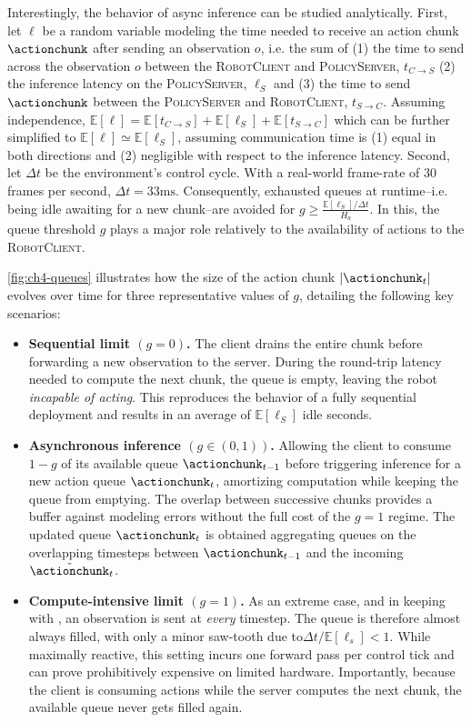 Interestingly, the behavior of async inference can be studied analytically. First, let \( \ell \) be a random variable modeling the time needed to receive an action chunk \( \actionchunk \) after sending an observation \( o \), i.e. the sum of (1) the time to send across the observation \( o \) between the \textsc{RobotClient} and \textsc{PolicyServer}, \( t_{C \to S}\) (2) the inference latency on the \textsc{PolicyServer}, \( \ell_S \) and (3) the time to send \( \actionchunk \) between the \textsc{PolicyServer} and \textsc{RobotClient}, \( t_{S \to C} \). Assuming independence, \( \mathbb E [\ell] = \mathbb E[t_{C \to S}] + \mathbb E[\ell_S] + \mathbb E[t_{S \to C}] \) which can be further simplified to \( \mathbb E[\ell] \simeq \mathbb E[\ell_S]  \), assuming communication time is (1) equal in both directions and (2) negligible with respect to the inference latency. Second, let \(\Delta t\) be the environment’s control cycle. With a real-world frame-rate of 30 frames per second, \(\Delta t=33\text{ms}\). Consequently, exhausted queues at runtime--i.e. being idle awaiting for a new chunk--are avoided for \( g \geq \frac{\mathbb E[\ell_S] / \Delta t}{H_a} \). In this, the queue threshold \( g \) plays a major role relatively to the availability of actions to the \textsc{RobotClient}.

\ref{fig:ch4-queues} illustrates how the size of the action chunk \(\lvert \actionchunk_t \rvert\) evolves over time for three representative values of \(g\), detailing the following key scenarios:
\begin{itemize}
    \item \textbf{Sequential limit \((g=0)\).} The client drains the entire chunk before forwarding a new observation to the server. During the round-trip latency needed to compute the next chunk, the queue is empty, leaving the robot \emph{incapable of acting}.  This reproduces the behavior of a fully sequential deployment and results in an average of \( \mathbb E[\ell_S] \) idle seconds.
    \item \textbf{Asynchronous inference \((g \in (0,1))\).} Allowing the client to consume \(1-g\) of its available queue \( \actionchunk_{t-1}\) before triggering inference for a new action queue \( \actionchunk_{t} \), amortizing computation while keeping the queue from emptying. The overlap between successive chunks provides a buffer against modeling errors without the full cost of the \(g=1\) regime. The updated queue \( \actionchunk_t\) is obtained aggregating queues on the overlapping timesteps between \( \actionchunk_{t-1}\) and the incoming \(\tilde{\actionchunk}_{t}\).
    \item \textbf{Compute-intensive limit \((g=1)\).}  As an extreme case, and in keeping with \citet{zhaoLearningFineGrainedBimanual2023}, an observation is sent at \emph{every} timestep. The queue is therefore almost always filled, with only a minor saw-tooth due to\(\Delta t/\mathbb E[\ell_s] < 1\). While maximally reactive, this setting incurs one forward pass per control tick and can prove prohibitively expensive on limited hardware. Importantly, because the client is consuming actions while the server computes the next chunk, the available queue never gets filled again.
\end{itemize}

